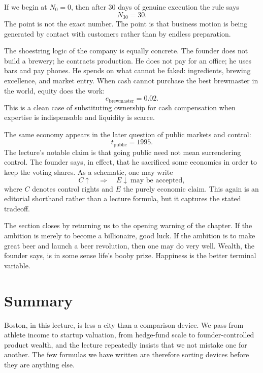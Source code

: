If we begin at \(N_0=0\), then after \(30\) days of genuine execution the rule says
\[
N_{30}=30.
\]
The point is not the exact number. The point is that business motion is being generated by contact with customers rather than by endless preparation.

The shoestring logic of the company is equally concrete. The founder does not build a brewery; he contracts production. He does not pay for an office; he uses bars and pay phones. He spends on what cannot be faked: ingredients, brewing excellence, and market entry. When cash cannot purchase the best brewmaster in the world, equity does the work:
\begin{equation}
e_{\text{brewmaster}} = 0.02.
\end{equation}
This is a clean case of substituting ownership for cash compensation when expertise is indispensable and liquidity is scarce.

The same economy appears in the later question of public markets and control:
\begin{equation}
t_{\text{public}} = 1995.
\end{equation}
The lecture's notable claim is that going public need not mean surrendering control. The founder says, in effect, that he sacrificed some economics in order to keep the voting shares. As a schematic, one may write
\begin{equation}
C \uparrow \quad \Longrightarrow \quad E \downarrow \ \text{may be accepted},
\end{equation}
where \(C\) denotes control rights and \(E\) the purely economic claim. This again is an editorial shorthand rather than a lecture formula, but it captures the stated tradeoff.

The section closes by returning us to the opening warning of the chapter. If the ambition is merely to become a billionaire, good luck. If the ambition is to make great beer and launch a beer revolution, then one may do very well. Wealth, the founder says, is in some sense life's booby prize. Happiness is the better terminal variable.

\section{Summary}

Boston, in this lecture, is less a city than a comparison device. We pass from athlete income to startup valuation, from hedge-fund scale to founder-controlled product wealth, and the lecture repeatedly insists that we not mistake one for another. The few formulas we have written are therefore sorting devices before they are anything else.

